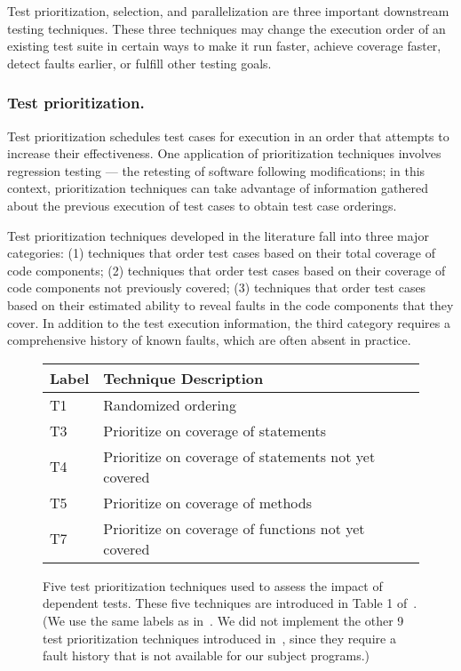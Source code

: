Test prioritization, selection, and parallelization are three
important downstream testing techniques. These three techniques may
change the execution order of an existing test suite in
certain ways to make it run
faster, achieve coverage faster, detect faults earlier,
or fulfill other testing goals.

\subsubsection{Test prioritization.}

Test prioritization schedules test cases
for execution in an order that attempts to
increase their effectiveness.
One application of prioritization techniques involves
regression testing --- the retesting of software following modifications;
in this context, prioritization techniques can take advantage of information gathered about the previous
execution of test cases to obtain test case orderings.

Test prioritization techniques developed in the literature
fall into three major categories: (1) techniques
that order test cases based on their total coverage of
code components; (2) techniques that order test
cases based on their coverage of code components
not previously covered; (3) techniques that order test
cases based on their estimated ability to reveal faults
in the code components that they cover. In addition to the
test execution information, the third
category requires a comprehensive history of known
faults, which are often absent in practice.


\begin{figure}
\centering
\setlength{\tabcolsep}{0.25\tabcolsep}
\begin{tabular}{|l|l|}
\hline
\textbf{Label} & \textbf{Technique Description} \\
\hline
T1 & Randomized ordering \\
T3 & Prioritize on coverage of statements \\
T4 & Prioritize on coverage of statements not yet covered\\
T5 & Prioritize on coverage of methods\\
T7 & Prioritize on coverage of functions not yet covered \\
\hline
\end{tabular}
\caption{Five test prioritization techniques used
to assess the impact of dependent tests. These five
techniques are introduced in Table 1
of~\cite{Elbaum:2000:PTC:347324.348910}. (We use
the same labels as in~\cite{Elbaum:2000:PTC:347324.348910}. We did not
implement the other 9 test prioritization techniques
introduced in~\cite{Elbaum:2000:PTC:347324.348910}, since
they require a fault history that is not
available for our subject programs.)
}
\label{tab:testprio}
\end{figure}




